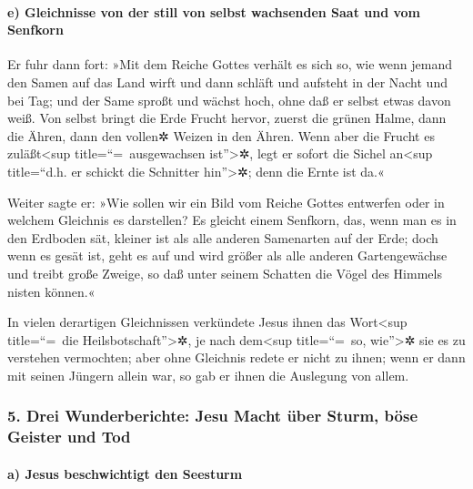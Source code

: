 \hypertarget{e-gleichnisse-von-der-still-von-selbst-wachsenden-saat-und-vom-senfkorn}{%
\paragraph{e) Gleichnisse von der still von selbst wachsenden Saat und
vom
Senfkorn}\label{e-gleichnisse-von-der-still-von-selbst-wachsenden-saat-und-vom-senfkorn}}

 Er fuhr dann fort: »Mit dem Reiche Gottes verhält es
sich so, wie wenn jemand den Samen auf das Land wirft 
und dann schläft und aufsteht in der Nacht und bei Tag; und der Same
sproßt und wächst hoch, ohne daß er selbst etwas davon weiß.
 Von selbst bringt die Erde Frucht hervor, zuerst die
grünen Halme, dann die Ähren, dann den vollen✲ Weizen in den Ähren.
 Wenn aber die Frucht es zuläßt\textless sup
title=``=~ausgewachsen ist''\textgreater✲, legt er sofort die Sichel
an\textless sup title=``d.h. er schickt die Schnitter
hin''\textgreater✲; denn die Ernte ist da.«

 Weiter sagte er: »Wie sollen wir ein Bild vom Reiche
Gottes entwerfen oder in welchem Gleichnis es darstellen?
 Es gleicht einem Senfkorn, das, wenn man es in den
Erdboden sät, kleiner ist als alle anderen Samenarten auf der Erde;
 doch wenn es gesät ist, geht es auf und wird größer als
alle anderen Gartengewächse und treibt große Zweige, so daß unter seinem
Schatten die Vögel des Himmels nisten können.«

 In vielen derartigen Gleichnissen verkündete Jesus ihnen
das Wort\textless sup title=``=~die Heilsbotschaft''\textgreater✲, je
nach dem\textless sup title=``=~so, wie''\textgreater✲ sie es zu
verstehen vermochten;  aber ohne Gleichnis redete er
nicht zu ihnen; wenn er dann mit seinen Jüngern allein war, so gab er
ihnen die Auslegung von allem.

\hypertarget{drei-wunderberichte-jesu-macht-uxfcber-sturm-buxf6se-geister-und-tod}{%
\subsubsection{5. Drei Wunderberichte: Jesu Macht über Sturm, böse
Geister und
Tod}\label{drei-wunderberichte-jesu-macht-uxfcber-sturm-buxf6se-geister-und-tod}}

\hypertarget{a-jesus-beschwichtigt-den-seesturm}{%
\paragraph{a) Jesus beschwichtigt den
Seesturm}\label{a-jesus-beschwichtigt-den-seesturm}}

